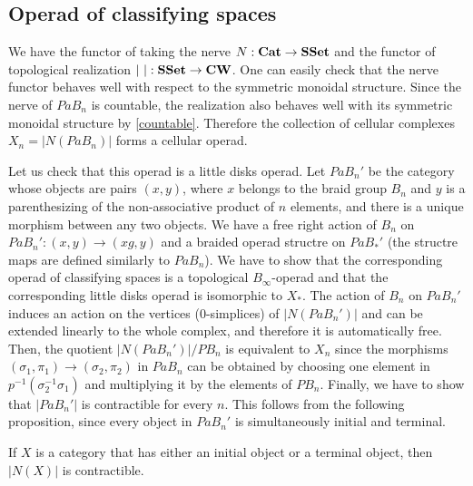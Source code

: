 \documentclass[TFM.tex]{subfiles}
\begin{document}
\subsection{Operad of classifying spaces}

We have the functor of taking the nerve $N:\mathrm{\mathbf{Cat}}\to\mathrm{\mathbf{SSet}}$ and the functor of topological realization $|\ |:\mathrm{\mathbf{SSet}}\to \mathrm{\mathbf{CW}}$. One can easily check that the nerve functor behaves well with respect to the symmetric monoidal structure. Since the nerve of $PaB_n$ is countable, the realization also behaves well with its symmetric monoidal structure by \ref{countable}. Therefore the collection of cellular complexes $X_n=|N(PaB_n)|$ forms a cellular operad. 

Let us check that this operad is a little disks operad. Let $PaB_n'$ be the category whose objects are pairs $(x,y)$, where $x$ belongs to the braid group $B_n$ and $y$ is a parenthesizing of the non-associative product of $n$ elements, and there is a unique morphism between any two objects. We have a free right action of $B_n$ on $PaB_n':(x,y)\to (xg,y)$ and a braided operad structre on $PaB_*'$ (the structre maps are defined similarly to $PaB_n$). We have to show that the corresponding operad of classifying spaces is a topological $B_\infty$-operad and that the corresponding little disks operad is isomorphic to $X_*$. The action of $B_n$ on $PaB_n'$ induces an action on the vertices (0-simplices) of $|N(PaB_n')|$ and can be extended linearly to the whole complex, and therefore it is automatically free. Then, the quotient $|N(PaB_n')|/PB_n$ is equivalent to $X_n$ since the morphisms $(\sigma_1,\pi_1)\to(\sigma_2,\pi_2)$ in $PaB_n$ can be obtained by choosing one element in $p^{-1}(\sigma_2^{-1}\sigma_1)$ and multiplying it by the elements of $PB_n$. Finally, we have to show that $|PaB_n'|$ is contractible for every $n$. This follows from the following proposition, since every object in $PaB_n'$ is simultaneously initial and terminal. %
\begin{prop}
	If $X$ is a category that has either an initial object or a terminal object, then $|N(X)|$ is contractible.
\end{prop}
\end{document}
